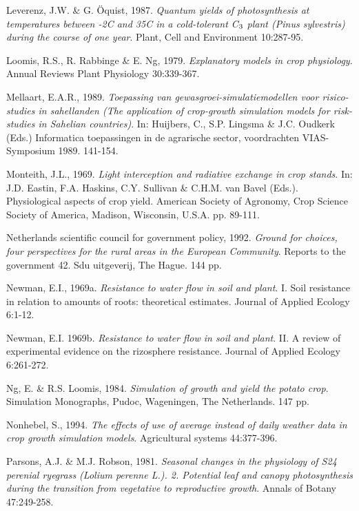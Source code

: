 Leverenz, J.W. \& G. \"{O}quist, 1987. {\it Quantum yields of photosynthesis at temperatures between -2\degrees C
and 35\degrees C in a cold-tolerant C$_{{\rm 3}}$ plant (Pinus sylvestris) during the course of one year\/}. Plant, Cell and
Environment 10:287-95.

Loomis, R.S., R. Rabbinge \& E. Ng, 1979. {\it Explanatory models in crop physiology\/}. Annual Reviews
Plant Physiology 30:339-367.

Mellaart, E.A.R., 1989. {\it Toepassing van gewasgroei-{\nobreak}simulatiemodellen voor risico-studies in
sahellanden (The application of crop-growth simulation models for risk-studies in Sahelian countries)\/}.
In: Huijbers, C., S.P. Lingsma \& J.C. Oudkerk (Eds.) Informatica toepassingen in de agrarische
sector, voordrachten VIAS-Symposium 1989. 141-154.

Monteith, J.L., 1969. {\it Light interception and radiative exchange in crop stands\/}. In: J.D. Eastin, F.A.
Haskins, C.Y. Sullivan \& C.H.M. van Bavel (Eds.). Physiological aspects of crop yield. American
Society of Agronomy, Crop Science  Society of America, Madison, Wisconsin, U.S.A. pp. 89-111.

Netherlands scientific council for government policy, 1992. {\it Ground for choices, four perspectives
for the rural areas in the European Community\/}. Reports to the government 42. Sdu uitgeverij, The
Hague. 144 pp.

Newman, E.I., 1969a. {\it Resistance to water flow in soil and plant\/}. I. Soil resistance in relation to
amounts of roots: theoretical estimates. Journal of Applied Ecology 6:1-12.

Newman, E.I. 1969b. {\it Resistance to water flow in soil and plant\/}. II. A review of experimental
evidence on the rizosphere resistance. Journal of Applied Ecology 6:261-272.

Ng, E. \& R.S. Loomis, 1984. {\it Simulation of growth and yield the potato crop\/}. Simulation
Monographs, Pudoc, Wageningen, The Netherlands. 147 pp.

Nonhebel, S., 1994. {\it The effects of use of average instead of daily weather data in crop growth
simulation models\/}. Agricultural systems 44:377-396.

Parsons, A.J. \& M.J. Robson, 1981. {\it Seasonal changes in the  physiology of S24 perenial ryegrass
(Lolium perenne L.). 2. Potential leaf and canopy photosynthesis during the transition from vegetative
to reproductive growth\/}. Annals of Botany 47:249-258.

